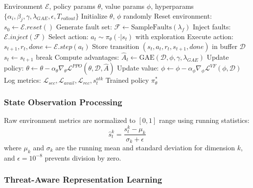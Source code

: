 \documentclass[conference,10pt]{IEEEtran}
\begin{document}
\begin{algorithm}[!t]
	\caption{SecChaos-RL Training Algorithm}
	\label{alg:secchaos_rl}
	\small
	\begin{algorithmic}[1]
		\REQUIRE Environment $\mathcal{E}$, policy params $\theta$, value params $\phi$, hyperparams $\{\alpha_i, \beta_j, \gamma, \lambda_{GAE}, \epsilon, T_{rollout}\}$
		\STATE Initialize $\theta$, $\phi$ randomly
		\STATE Reset environment: $s_0 \leftarrow \mathcal{E}.reset()$
		\STATE Generate fault set: $\mathcal{F} \leftarrow \text{SampleFaults}(\lambda_f)$
		\STATE Inject faults: $\mathcal{E}.inject(\mathcal{F})$
		\STATE Select action: $a_t \sim \pi_\theta(\cdot|s_t)$ with exploration
		\STATE Execute action: $s_{t+1}, r_t, done \leftarrow \mathcal{E}.step(a_t)$
		\STATE Store transition $(s_t, a_t, r_t, s_{t+1}, done)$ in buffer $\mathcal{D}$
		\STATE $s_t \leftarrow s_{t+1}$
		\STATE break
		\ENDIF
		\ENDFOR
		\STATE Compute advantages: $\hat{A}_t \leftarrow \text{GAE}(\mathcal{D}, \phi, \gamma, \lambda_{GAE})$
		\STATE Update policy: $\theta \leftarrow \theta - \alpha_\theta \nabla_\theta \mathcal{L}^{PPO}(\theta, \mathcal{D}, \hat{A})$
		\STATE Update value: $\phi \leftarrow \phi - \alpha_\phi \nabla_\phi \mathcal{L}^{VF}(\phi, \mathcal{D})$
		\STATE Log metrics: $\mathcal{L}_{sec}, \mathcal{L}_{avail}, \mathcal{L}_{rec}, s_t^{atk}$
		\ENDFOR
		\RETURN Trained policy $\pi_\theta^*$
	\end{algorithmic}
\end{algorithm}

\subsubsection{State Observation Processing}

Raw environment metrics are normalized to $[0, 1]$ range using running statistics:
\begin{equation}
	\hat{s}_t^{k} = \frac{s_t^{k} - \mu_k}{\sigma_k + \epsilon}
\end{equation}
where $\mu_k$ and $\sigma_k$ are the running mean and standard deviation for dimension $k$, and $\epsilon = 10^{-8}$ prevents division by zero.

\subsubsection{Threat-Aware Representation Learning}
\end{document}
